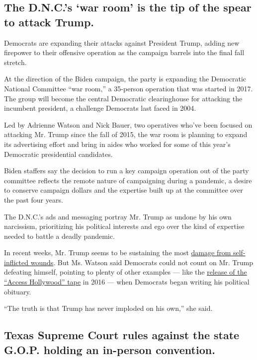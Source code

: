 \hypertarget{the-dncs-war-room-is-the-tip-of-the-spear-to-attack-trump}{%
\subsection{The D.N.C.'s `war room' is the tip of the spear to attack
Trump.}\label{the-dncs-war-room-is-the-tip-of-the-spear-to-attack-trump}}

Democrats are expanding their attacks against President Trump, adding
new firepower to their offensive operation as the campaign barrels into
the final fall stretch.

At the direction of the Biden campaign, the party is expanding the
Democratic National Committee ``war room,'' a 35-person operation that
was started in 2017. The group will become the central Democratic
clearinghouse for attacking the incumbent president, a challenge
Democrats last faced in 2004.

Led by Adrienne Watson and Nick Bauer, two operatives who've been
focused on attacking Mr. Trump since the fall of 2015, the war room is
planning to expand its advertising effort and bring in aides who worked
for some of this year's Democratic presidential candidates.

Biden staffers say the decision to run a key campaign operation out of
the party committee reflects the remote nature of campaigning during a
pandemic, a desire to conserve campaign dollars and the expertise built
up at the committee over the past four years.

The D.N.C.'s ads and messaging portray Mr. Trump as undone by his own
narcissism, prioritizing his political interests and ego over the kind
of expertise needed to battle a deadly pandemic.

In recent weeks, Mr. Trump seems to be sustaining the most
\href{https://www.nytimes.com/2020/07/02/us/politics/trump-2020-campaign-problems.html}{damage
from self-inflicted wounds}. But Ms. Watson said Democrats could not
count on Mr. Trump defeating himself, pointing to plenty of other
examples --- like the
\href{https://www.nytimes.com/2020/07/12/us/politics/donald-trump-access-hollywood.html}{release
of the ``Access Hollywood'' tape} in 2016 --- when Democrats began
writing his political obituary.

``The truth is that Trump has never imploded on his own,'' she said.

\hypertarget{texas-supreme-court-rules-against-the-state-gop-holding-an-in-person-convention}{%
\subsection{Texas Supreme Court rules against the state G.O.P. holding
an in-person
convention.}\label{texas-supreme-court-rules-against-the-state-gop-holding-an-in-person-convention}}

